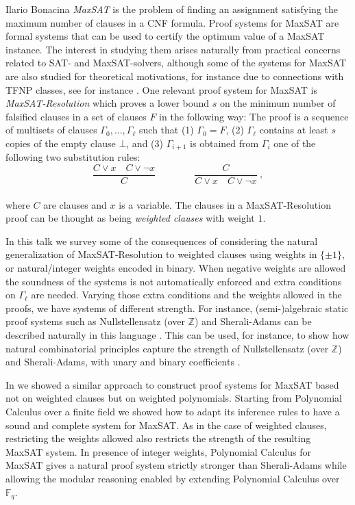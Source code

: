 \documentclass[report]{owrart}
\begin{document}
\begin{report}
\begin{talk}{Ilario Bonacina}
  \noindent
  \emph{MaxSAT} is the problem of finding an assignment satisfying the maximum number of clauses in a CNF formula. Proof systems for MaxSAT are formal systems that can be used to certify the optimum value of a MaxSAT instance. The interest in studying them arises naturally from practical concerns related to SAT- and MaxSAT-solvers,  although some of the systems for MaxSAT are also studied for theoretical motivations, for instance due to connections with TFNP classes, see for instance \cite{Bonacina-TFNP}. 
One relevant proof system for MaxSAT is \emph{MaxSAT-Resolution} \cite{Bonacina-Larrosa,Bonacina-BLM.07} which proves a lower bound $s$ on the minimum number of falsified clauses in a set of clauses $F$ in the following way: The proof is a sequence of multisets of clauses $\Gamma_0,\dots,\Gamma_\ell$ such that (1) $\Gamma_0=F$, (2) $\Gamma_\ell$ contains at least $s$ copies of the empty clause $\bot$, and (3) $\Gamma_{i+1}$ is obtained from $\Gamma_i$ one of the following two substitution rules:
\[
\frac{C\lor x\quad C\lor \lnot x}{C}\qquad\qquad \frac{C}{C\lor x\quad C\lor \lnot x}\ ,
\]
\\[.1em]
where $C$ are clauses and $x$ is a variable. The clauses in a MaxSAT-Resolution proof can be thought as being \emph{weighted clauses} with weight $1$. 

In this talk we survey some of the consequences of considering the natural generalization of MaxSAT-Resolution to weighted clauses using weights in $\{\pm 1\}$, or natural/integer weights encoded in binary. 
When negative weights are allowed the soundness of the systems is not automatically enforced and extra conditions on $\Gamma_\ell$ are needed. 
Varying those extra conditions and the weights allowed in the proofs, we have systems of different strength.
For instance, (semi-)algebraic static proof systems such as Nullstellensatz (over $\mathbb Z$) and Sherali-Adams can be described naturally in this language \cite{Bonacina-BL.20, Bonacina-BBL.24}.
This can be used, for instance, to show how natural combinatorial principles capture the strength of Nullstellensatz (over $\mathbb Z$) and Sherali-Adams, with unary and binary coefficients  \cite{Bonacina-BL.22}.

In \cite{Bonacina-BBL.23} we showed a similar approach to construct proof systems for MaxSAT based not on weighted clauses but on weighted polynomials. Starting from Polynomial Calculus over a finite field we showed how to adapt its inference rules to have a sound and complete system for MaxSAT. As in the case of weighted clauses, restricting the weights allowed also restricts the strength of the resulting MaxSAT system. In presence of integer weights, Polynomial Calculus for MaxSAT gives a natural proof system strictly stronger than Sherali-Adams while allowing the modular reasoning enabled by extending Polynomial Calculus over $\mathbb F_q$.
  

\end{talk}
\end{report}
\end{document}
